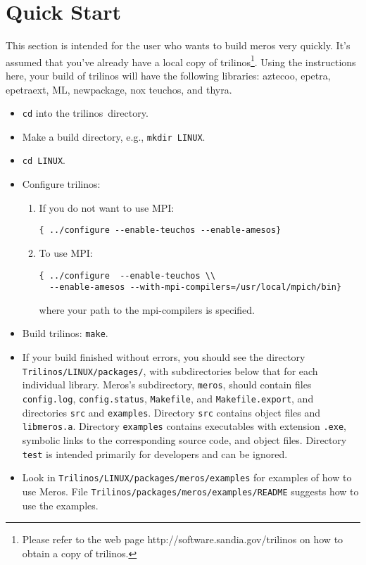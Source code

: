 \documentclass[oneeqnum,onefignum,onetabnum,10pt]{SANDreport}
\begin{document}
\appendix

\section{Quick Start}
This section is intended for the user who wants to build meros very quickly.
It's assumed that you've already have a local copy of
trilinos\footnote{Please refer to the web page {\sc
  http://software.sandia.gov/trilinos} on how to obtain a copy of
    trilinos.}.
Using the instructions here, your build of trilinos will have the following
libraries: aztecoo, epetra, epetraext, ML, newpackage,
nox teuchos, and thyra.
\begin{itemize}
\item \verb!cd! into the trilinos~directory.
\item Make a build directory, e.g., \verb!mkdir LINUX!.
\item \verb!cd LINUX!.
\item Configure trilinos:
  \begin{enumerate}
  \item   If you do not want to use MPI:
\begin{verbatim} 
{ ../configure --enable-teuchos --enable-amesos} 
\end{verbatim}
  \item To use MPI:
\begin{verbatim} 
{ ../configure  --enable-teuchos \\
  --enable-amesos --with-mpi-compilers=/usr/local/mpich/bin} 
\end{verbatim}
where your path to the mpi-compilers is specified.
  \end{enumerate}

\item Build trilinos: \verb!make!.
\item If your build finished without errors, you should see the directory\\
\verb!Trilinos/LINUX/packages/!, with subdirectories below that for
each individual library.   Meros's subdirectory, \verb!meros!, should contain
files \verb!config.log!, \verb!config.status!, \verb!Makefile!, and
\verb!Makefile.export!, and directories \verb!src! and \verb!examples!.
Directory \verb!src! contains object files and \verb!libmeros.a!.
Directory \verb!examples! contains executables with extension \verb!.exe!,
symbolic links to the corresponding source code, and object files.
Directory \verb!test! is intended primarily for developers and can be ignored.
\item Look in \verb!Trilinos/LINUX/packages/meros/examples! for examples of how
to use Meros. File \verb!Trilinos/packages/meros/examples/README! suggests how to
use the examples.
\end{itemize}
\end{document}
